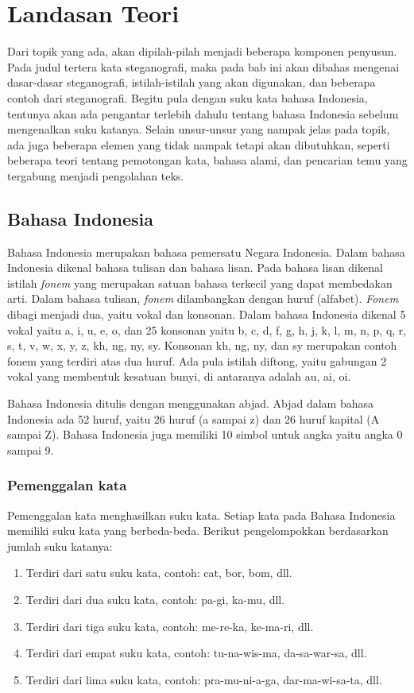 \chapter{Landasan Teori}
\label{chap:landasan_teori}

Dari topik yang ada, akan dipilah-pilah menjadi beberapa komponen penyusun. Pada judul tertera kata steganografi, maka pada bab ini akan dibahas mengenai dasar-dasar steganografi, istilah-istilah yang akan digunakan, dan beberapa contoh dari steganografi. Begitu pula dengan suku kata bahasa Indonesia, tentunya akan ada pengantar terlebih dahulu tentang bahasa Indonesia sebelum mengenalkan suku katanya. Selain unsur-unsur yang nampak jelas pada topik, ada juga beberapa elemen yang tidak nampak tetapi akan dibutuhkan, seperti beberapa teori tentang pemotongan kata, bahasa alami, dan pencarian temu yang tergabung menjadi pengolahan teks.

\section{Bahasa Indonesia \cite{eyd:2009}}
Bahasa Indonesia merupakan bahasa pemersatu Negara Indonesia. Dalam bahasa Indonesia dikenal bahasa tulisan dan bahasa lisan. Pada bahasa lisan dikenal istilah \textit{fonem} yang merupakan satuan bahasa terkecil yang dapat membedakan arti. Dalam bahasa tulisan, \textit{fonem} dilambangkan dengan huruf (alfabet). \textit{Fonem} dibagi menjadi dua, yaitu vokal dan konsonan. Dalam bahasa Indonesia dikenal 5 vokal yaitu a, i, u, e, o, dan 25 konsonan yaitu b, c, d, f, g, h, j, k, l, m, n, p, q, r, s, t, v, w, x, y, z, kh, ng, ny, sy. Konsonan kh, ng, ny, dan sy merupakan contoh fonem yang terdiri atas dua huruf. Ada pula istilah diftong, yaitu gabungan 2 vokal yang membentuk kesatuan bunyi, di antaranya adalah au, ai, oi.

Bahasa Indonesia ditulis dengan menggunakan abjad. Abjad dalam bahasa Indonesia ada 52 huruf, yaitu 26 huruf (a sampai z) dan 26 huruf kapital (A sampai Z). Bahasa Indonesia juga memiliki 10 simbol untuk angka yaitu angka 0 sampai 9.

\subsection{Pemenggalan kata}
Pemenggalan kata menghasilkan suku kata. Setiap kata pada Bahasa Indonesia memiliki suku kata yang berbeda-beda. 
Berikut pengelompokkan berdasarkan jumlah suku katanya:

\begin{enumerate}
	\item Terdiri dari satu suku kata, contoh: cat, bor, bom, dll.
	\item Terdiri dari dua suku kata, contoh: pa-gi, ka-mu, dll.
	\item Terdiri dari tiga suku kata, contoh: me-re-ka, ke-ma-ri, dll.
	\item Terdiri dari empat suku kata, contoh: tu-na-wis-ma, da-sa-war-sa, dll.
	\item Terdiri dari lima suku kata, contoh: pra-mu-ni-a-ga, dar-ma-wi-sa-ta, dll.
\end{enumerate}

